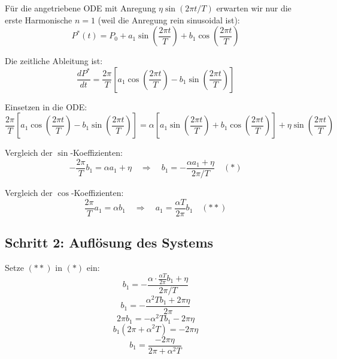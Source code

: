 \documentclass[a4paper, 12pt, twoside, openright]{report}
\theoremstyle{definition}
\theoremstyle{definition}
\begin{document}
Für die angetriebene ODE mit Anregung $\eta \sin(2\pi t / T)$ erwarten wir nur die erste Harmonische $n=1$ (weil die Anregung rein sinusoidal ist):
\begin{equation}
    P^*(t) = P_0 + a_1 \sin\left(\frac{2\pi t}{T}\right) + b_1 \cos\left(\frac{2\pi t}{T}\right)
\end{equation}

Die zeitliche Ableitung ist:
\begin{equation}
    \frac{dP^*}{dt} = \frac{2\pi}{T}\left[a_1 \cos\left(\frac{2\pi t}{T}\right) - b_1 \sin\left(\frac{2\pi t}{T}\right)\right]
\end{equation}

Einsetzen in die ODE:
\begin{equation}
    \frac{2\pi}{T}\left[a_1 \cos\left(\frac{2\pi t}{T}\right) - b_1 \sin\left(\frac{2\pi t}{T}\right)\right] = \alpha\left[a_1 \sin\left(\frac{2\pi t}{T}\right) + b_1 \cos\left(\frac{2\pi t}{T}\right)\right] + \eta \sin\left(\frac{2\pi t}{T}\right)
\end{equation}

Vergleich der $\sin$-Koeffizienten:
\begin{equation}
    -\frac{2\pi}{T} b_1 = \alpha a_1 + \eta \quad \Rightarrow \quad b_1 = -\frac{\alpha a_1 + \eta}{2\pi/T} \quad (*)
\end{equation}

Vergleich der $\cos$-Koeffizienten:
\begin{equation}
    \frac{2\pi}{T} a_1 = \alpha b_1 \quad \Rightarrow \quad a_1 = \frac{\alpha T}{2\pi} b_1 \quad (**)
\end{equation}

\subsection{Schritt 2: Auflösung des Systems}

Setze $(**)$ in $(*)$ ein:
\begin{equation}
    b_1 = -\frac{\alpha \cdot \frac{\alpha T}{2\pi} b_1 + \eta}{2\pi/T}
\end{equation}
\begin{equation}
    b_1 = -\frac{\alpha^2 T b_1 + 2\pi \eta}{2\pi}
\end{equation}
\begin{equation}
    2\pi b_1 = -\alpha^2 T b_1 - 2\pi \eta
\end{equation}
\begin{equation}
    b_1(2\pi + \alpha^2 T) = -2\pi \eta
\end{equation}
\begin{equation}
    b_1 = \frac{-2\pi \eta}{2\pi + \alpha^2 T}
\end{equation}
\end{document}
